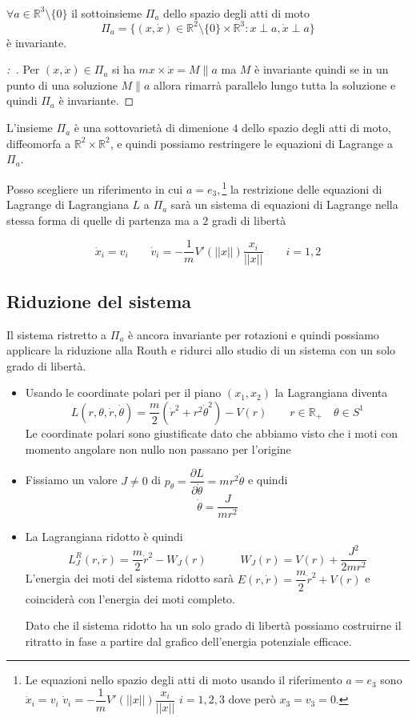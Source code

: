\documentclass[11pt,a4paper,twoside]{book}
\newenvironment{corollario}[1][\empty]{\begin{Corollario}{
\ifx\empty#1\relax\else\mdseries\itshape#1\\\fi
}{}}{\end{Corollario}}
\newenvironment{dimo}[1][\proofname]{
	\begin{tcolorbox}[
	breakable, 
	enhanced, 
	interior hidden, 
	frame hidden, 
	borderline west = {1pt}{0pt}{gray}, 
	top=0pt, bottom=0pt, left=0pt]
\begin{proof}[#1:~]
}
{
\end{proof}
\end{tcolorbox}
}
\theoremstyle{esss}
\theoremstyle{dotless}
\numberwithin{equation}{section} %
\begin{document}
\begin{corollario}
$\forall a\in\mathbb{R}^3\setminus\{0\}$ il sottoinsieme $\Pi_a$ dello spazio degli atti di moto
\[
\Pi_a=\{ (x,\dot{x})\in\mathbb{R}^2\setminus\{0\}\times\mathbb{R}^3 : x\perp a , \dot{x}\perp a \}
\]
è invariante.
\end{corollario}
\begin{dimo}
Per $(x,\dot{x})\in\Pi_a$ si ha $mx\times\dot{x}=M\parallel a$ ma $M$ è invariante quindi se in un punto di una soluzione $M\parallel a$ allora rimarrà parallelo lungo tutta la soluzione e quindi $\Pi_a$ è invariante. \qedhere 
\end{dimo}

L'insieme $\Pi_a$ è una sottovarietà di dimenione $4$ dello spazio degli atti di moto, diffeomorfa a $\mathbb{R}^2\times\mathbb{R}^2$, e quindi possiamo restringere le equazioni di Lagrange a $\Pi_a$.

Posso scegliere un riferimento in cui $a=e_3,$\footnote[1]{Le equazioni nello spazio degli atti di moto usando il riferimento $a=e_3$ sono $\dot{x}_i=v_i$ $\dot{v}_i=-\dfrac{1}{m}V'(||x||)\dfrac{x_i}{||x||}$ $i=1,2,3$ dove però $x_3=v_3=0$.} la restrizione delle equazioni di Lagrange di Lagrangiana $L$ a $\Pi_a$ sarà un sistema di equazioni di Lagrange nella stessa forma di quelle di partenza ma a $2$ gradi di libertà 

\[
\dot{x}_i=v_i\qquad \dot{v}_i=-\dfrac{1}{m}V'(||x||)\dfrac{x_i}{||x||} \qquad i=1,2
\]

\subsection{Riduzione del sistema}

Il sistema ristretto a $\Pi_a$ è ancora invariante per rotazioni e quindi possiamo applicare la riduzione alla Routh e ridurci allo studio di un sistema con un solo grado di libertà.

\begin{itemize}
\item Usando le coordinate polari per il piano $(x_1,x_2)$ la Lagrangiana diventa
\[
L(r,\theta,\dot{r},\dot{\theta})=\dfrac{m}{2}(\dot{r}^2+r^2\dot{\theta}^2)-V(r)\qquad r\in\mathbb{R}_+\quad \theta\in S^1
\]
Le coordinate polari sono giustificate dato che abbiamo visto che i moti con momento angolare non nullo non passano per l'origine
\item Fissiamo un valore $J\neq0$ di $p_\theta=\dfrac{\partial L}{\partial \dot{\theta}}=mr^2\dot{\theta}$ e quindi
\[
\dot{\theta}=\dfrac{J}{mr^2}
\]
\item La Lagrangiana ridotto è quindi
\[
L_J^R(r,\dot{r})=\dfrac{m}{2}\dot{r}^2-W_J(r) \qquad \quad W_J(r)=V(r)+\dfrac{J^2}{2mr^2}
\]
L'energia dei moti del sistema ridotto sarà $E(r,\dot{r})=\dfrac{m}{2}\dot{r}^2+V(r)$ e coinciderà con l'energia dei moti completo.

Dato che il sistema ridotto ha un solo grado di libertà possiamo costruirne il ritratto in fase a partire dal grafico dell'energia potenziale efficace.
\end{itemize}
\end{document}
